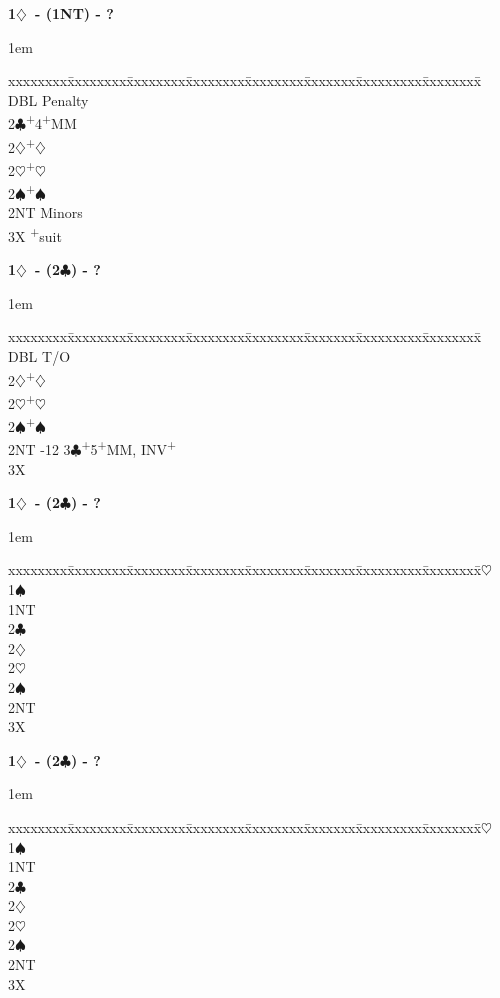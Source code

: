 \documentclass[10pt]{article}
\renewcommand{\c}{$\clubsuit$}
\renewcommand{\d}{$\diamondsuit$}
\newcommand{\h}{$\heartsuit$}
\newcommand{\s}{$\spadesuit$}
\newcommand{\p}{\textsuperscript{+}}
\newcommand{\x}{DBL}
\newenvironment{bidtable}[1][]
{\textbf{#1}
  \begin{adjustwidth}{1em}{}
    \addvspace{2pt}
    \begin{tabbing}
      xxxxxxxx\=xxxxxxxx\=xxxxxxxx\=xxxxxxxx\=xxxxxxxx\=xxxxxxx\=xxxxxxxxx\=xxxxxxxx\=\kill}
{\end{tabbing}\end{adjustwidth}\bigskip}%
\begin{document}
\begin{bidtable}[1\d\ - (1NT) - ?]
\x  \> Penalty                        \\
2\c {}\p 4\p MM                     \\
2\d {}\p\d                          \\
2\h {}\p\h                          \\
2\s {}\p\s                          \\
2NT \> Minors                         \\
3X  \p suit                       \\
\end{bidtable}

\begin{bidtable}[1\d\ - (2\c) - ?]
\x \> T/O                               \\
2\d {}\p\d                               \\
2\h {}\p\h                               \\
2\s {}\p\s                               \\
2NT -12
3\c {}\p 5\p MM, INV\p                              \\
3X  \>                                \\
\end{bidtable}
\begin{bidtable}[1\d\ - (2\c) - ?]
1\h \>                                \\
1\s \>                                \\
1NT \>                                \\
2\c \>                                \\
2\d \>                                \\
2\h \>                                \\
2\s \>                                \\
2NT \>                                \\
3X  \>                                \\
\end{bidtable}
\begin{bidtable}[1\d\ - (2\c) - ?]
1\h \>                                \\
1\s \>                                \\
1NT \>                                \\
2\c \>                                \\
2\d \>                                \\
2\h \>                                \\
2\s \>                                \\
2NT \>                                \\
3X  \>                                \\
\end{bidtable}
\end{document}
